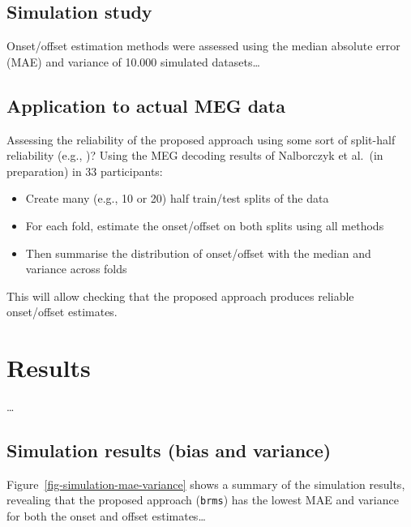 \documentclass[
  doc,
  floatsintext,
  longtable,
  a4paper,
  nolmodern,
  notxfonts,
  notimes,
  colorlinks=true,linkcolor=blue,citecolor=blue,urlcolor=blue]{apa7}
\providecommand{\tightlist}{%
  \setlength{\itemsep}{0pt}\setlength{\parskip}{0pt}}
\begin{document}
\newpage

\subsection{Simulation study}\label{simulation-study}

Onset/offset estimation methods were assessed using the median absolute
error (MAE) and variance of 10.000 simulated datasets\ldots{}

\subsection{Application to actual MEG
data}\label{application-to-actual-meg-data}

Assessing the reliability of the proposed approach using some sort of
split-half reliability (e.g., )? Using the MEG decoding results of Nalborczyk et al.~(in
preparation) in 33 participants:

\begin{itemize}
\tightlist
\item
  Create many (e.g., 10 or 20) half train/test splits of the data
\item
  For each fold, estimate the onset/offset on both splits using all
  methods
\item
  Then summarise the distribution of onset/offset with the median and
  variance across folds
\end{itemize}

This will allow checking that the proposed approach produces reliable
onset/offset estimates.

\section{Results}\label{results}

\ldots{}

\subsection{Simulation results (bias and
variance)}\label{simulation-results-bias-and-variance}

Figure~\ref{fig-simulation-mae-variance} shows a summary of the
simulation results, revealing that the proposed approach (\texttt{brms})
has the lowest MAE and variance for both the onset and offset
estimates\ldots{}
\end{document}
